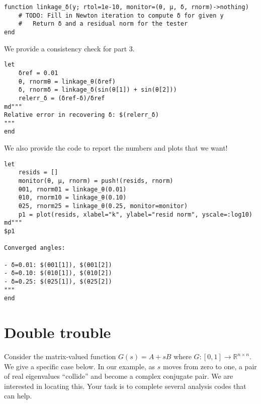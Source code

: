 \documentclass[12pt, leqno]{article} %
\begin{document}
\begin{verbatim}
function linkage_δ(y; rtol=1e-10, monitor=(θ, μ, δ, rnorm)->nothing)
    # TODO: Fill in Newton iteration to compute δ for given y
    #   Return δ and a residual norm for the tester
end
\end{verbatim}

We provide a consistency check for part 3.

\begin{verbatim}
let
    δref = 0.01
    θ, rnormθ = linkage_θ(δref)
    δ, rnormδ = linkage_δ(sin(θ[1]) + sin(θ[2]))
    relerr_δ = (δref-δ)/δref
md"""
Relative error in recovering δ: $(relerr_δ)
"""
end
\end{verbatim}

We also provide the code to report the numbers and plots that we want!

\begin{verbatim}
let
    resids = []
    monitor(θ, μ, rnorm) = push!(resids, rnorm)
    θ01, rnorm01 = linkage_θ(0.01)
    θ10, rnorm10 = linkage_θ(0.10)
    θ25, rnorm25 = linkage_θ(0.25, monitor=monitor)
    p1 = plot(resids, xlabel="k", ylabel="resid norm", yscale=:log10)
md"""
$p1

Converged angles:

- δ=0.01: $(θ01[1]), $(θ01[2])
- δ=0.10: $(θ10[1]), $(θ10[2])
- δ=0.25: $(θ25[1]), $(θ25[2])
"""
end
\end{verbatim}


\section{Double trouble}

Consider the matrix-valued function \(G(s) = A+sB\) where
\(G : [0,1] \rightarrow \mathbb{R}^{n \times n}\). We give a specific
case below. In our example, as \(s\) moves from zero to one, a pair of
real eigenvalues ``collide'' and become a complex conjugate pair. We are
interested in locating this. Your task is to complete several analysis
codes that can help.
\end{document}
